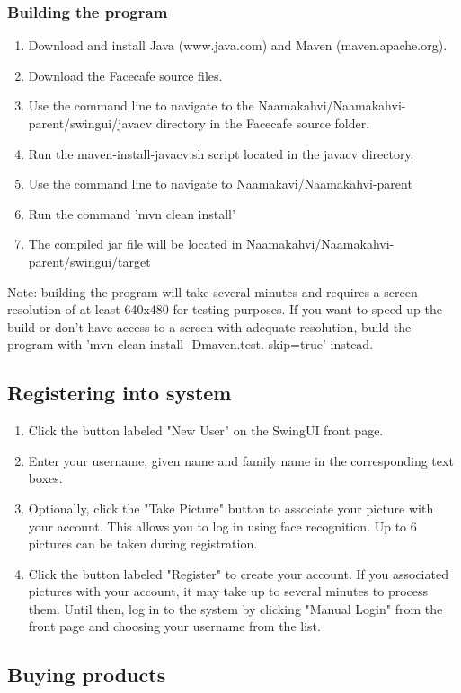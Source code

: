 \documentclass[11pt]{article}
\begin{document}
\subsubsection*{Building the program}
\begin{enumerate}
\item{Download and install Java (www.java.com) and 
Maven (maven.apache.org).}
\item{Download the Facecafe source files.}
\item{Use the command line to navigate to the Naamakahvi/Naamakahvi-parent/swingui/javacv
directory in the Facecafe source folder.}
\item{Run the maven-install-javacv.sh script located in the javacv directory.}
\item{Use the command line to navigate to Naamakavi/Naamakahvi-parent}
\item{Run the command 'mvn clean install'}
\item{The compiled jar file will be located in Naamakahvi/Naamakahvi-parent/swingui/target}
\end{enumerate}
Note: building the program will take several minutes and requires a screen resolution of at
least 640x480 for testing purposes. If you want to speed up the build or don't have access
to a screen with adequate resolution, build the program with 'mvn clean install -Dmaven.test.
skip=true' instead.
\subsection{Registering into system}
\begin{enumerate}
\item{Click the button labeled "New User" on the SwingUI front page.}
\item{Enter your username, given name and family name in the corresponding text boxes.}
\item{Optionally, click the "Take Picture" button to associate your picture with your account.
This allows you to log in using face recognition. Up to 6 pictures can be taken during
registration.}
\item{Click the button labeled "Register" to create your account. If you associated pictures
with your account, it may take up to several minutes to process them. Until then, log in to
the system by clicking "Manual Login" from the front page and choosing your username from
the list.}
\end{enumerate}
\subsection{Buying products}
\end{document}
